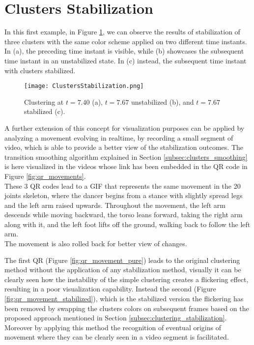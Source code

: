 \clearpage
\section{Clusters Stabilization}
In this first example, in Figure \ref{fig:stabilization_results}, we can observe the results of stabilization of three clusters with the same color scheme applied on two different time instants. 
In (a), the preceding time instant is visible, while (b) showcases the subsequent time instant in an unstabilized state. 
In (c) instead, the subsequent time instant with clusters stabilized.
\begin{figure}[H]
  \centering
  \texttt{[image: ClustersStabilization.png]}
  \caption{Clustering at $t=7.40$ (a), $t=7.67$ unstabilized (b), and $t=7.67$ stabilized (c).}
  \label{fig:stabilization_results}
\end{figure}

A further extension of this concept for visualization purposes can be applied by analyzing a movement evolving in realtime, by recording a small segment of video, which is able to provide a better view of the stabilization outcomes.
The transition smoothing algorithm explained in Section \ref{subsec:clusters_smoothing} is here visualized in the videos whose link has been embedded in the QR code in Figure \ref{fig:qr_movements}. \\

These 3 QR codes lead to a GIF that represents the same movement in the 20 joints skeleton, where the dancer begins from a stance with slightly spread legs and the left arm raised upwards.
Throughout the movement, the left arm descends while moving backward, the torso leans forward, taking the right arm along with it, and the left foot lifts off the ground, walking back to follow the left arm.\\
The movement is also rolled back for better view of changes.

The first QR (Figure \ref{fig:qr_movement_pure}) leads to the original clustering method without the application of any stabilization method, visually it can be clearly seen how the instability of the simple clustering creates a flickering effect, resulting in a poor visualization capability.
Instead the second (Figure \ref{fig:qr_movement_stabilized}), which is the stabilized version the flickering has been removed by swapping the clusters colors on subsequent frames based on the proposed approach mentioned in Section \ref{subsec:clustering_stabilization}.
Moreover by applying this method the recognition of eventual origins of movement where they can be clearly seen in a video segment is facilitated. \\

